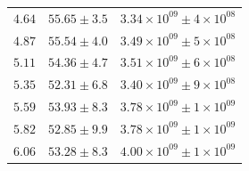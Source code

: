\documentclass{article}
\begin{document}
\begin{table}[h!]
\begin{tabular}{|c|c|c|}
        $4.64$ & $55.65 \pm 3.5$ & $3.34\times 10^{09} \pm 4\times 10^{08}$ \\
        $4.87$ & $55.54 \pm 4.0$ & $3.49\times 10^{09} \pm 5\times 10^{08}$ \\
        $5.11$ & $54.36 \pm 4.7$ & $3.51\times 10^{09} \pm 6\times 10^{08}$ \\
        $5.35$ & $52.31 \pm 6.8$ & $3.40\times 10^{09} \pm 9\times 10^{08}$ \\
        $5.59$ & $53.93 \pm 8.3$ & $3.78\times 10^{09} \pm 1\times 10^{09}$ \\
        $5.82$ & $52.85 \pm 9.9$ & $3.78\times 10^{09} \pm 1\times 10^{09}$ \\
        $6.06$ & $53.28 \pm 8.3$ & $4.00\times 10^{09} \pm 1\times 10^{09}$ \\
        \hline
    \end{tabular}
\end{table}
\end{document}
